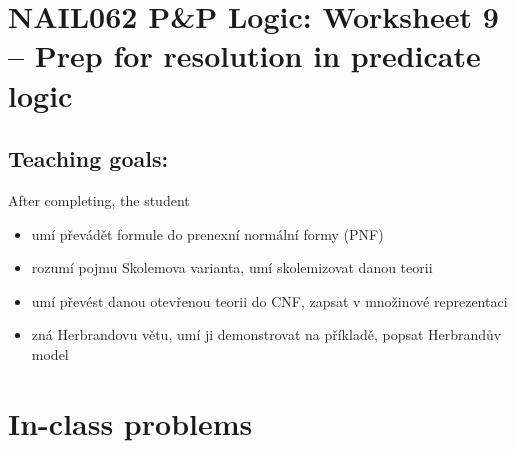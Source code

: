 \section*{NAIL062 P\&P Logic: Worksheet 9 -- Prep for resolution in predicate logic}


\subsection*{Teaching goals:} After completing, the student

    \begin{itemize}\setlength{\itemsep}{0pt}
        \item umí převádět formule do prenexní normální formy (PNF)
        \item rozumí pojmu Skolemova varianta, umí skolemizovat danou teorii
        \item umí převést danou otevřenou teorii do CNF, zapsat v množinové reprezentaci
        \item zná Herbrandovu větu, umí ji demonstrovat na příkladě, popsat Herbrandův model
    \end{itemize}
    

\section*{In-class problems}


